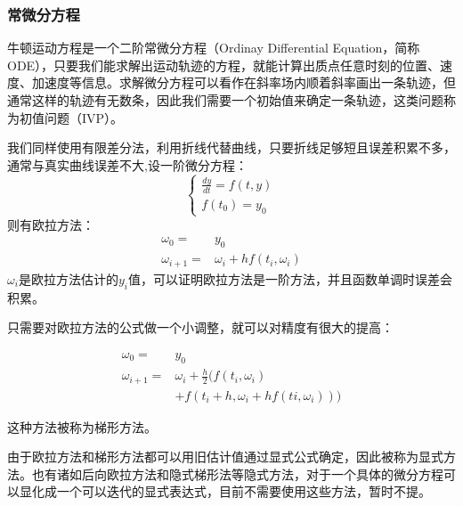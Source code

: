 \documentclass[UTF8,a4paper,10pt]{ctexart}
\begin{document}
\begin{multicols}{2}
            \subsubsection{常微分方程}
            牛顿运动方程是一个二阶常微分方程（Ordinay Differential Equation，简称ODE），只要我们能求解出运动轨迹的方程，就能计算出质点任意时刻的位置、速度、加速度等信息。求解微分方程可以看作在斜率场内顺着斜率画出一条轨迹，但通常这样的轨迹有无数条，因此我们需要一个初始值来确定一条轨迹，这类问题称为初值问题（IVP）。\par
            我们同样使用有限差分法，利用折线代替曲线，只要折线足够短且误差积累不多，通常与真实曲线误差不大,设一阶微分方程：
            \begin{equation}
                \left\{ \begin{array}{l}
                    \frac{dy}{dt} = f(t,y)\\
                    f(t_0) = y_0
                \end{array}\right.
            \end{equation}
            则有欧拉方法：
            \begin{equation}
                \begin{split}
                    \omega_0 =& y_0\\
                    \omega_{i+1} =& \omega_i + hf(t_i,\omega_i)
                \end{split}
            \end{equation}
            $\omega_i$是欧拉方法估计的$y_i$值，可以证明欧拉方法是一阶方法，并且函数单调时误差会积累。\par
            只需要对欧拉方法的公式做一个小调整，就可以对精度有很大的提高：
            \begin{small}
                \begin{equation}
                    \begin{split}
                        \omega_0 =& y_0\\
                        \omega_{i+1} =& \omega_i + \frac{h}{2}(f(t_i,\omega_i)\\
                        &+f(t_i+h,\omega_i+hf(ti,\omega_i)))
                    \end{split}
                \end{equation}
            \end{small}
            这种方法被称为梯形方法。\par
            由于欧拉方法和梯形方法都可以用旧估计值通过显式公式确定，因此被称为显式方法。也有诸如后向欧拉方法和隐式梯形法等隐式方法，对于一个具体的微分方程可以显化成一个可以迭代的显式表达式，目前不需要使用这些方法，暂时不提。\par

\end{multicols}
\end{document}

